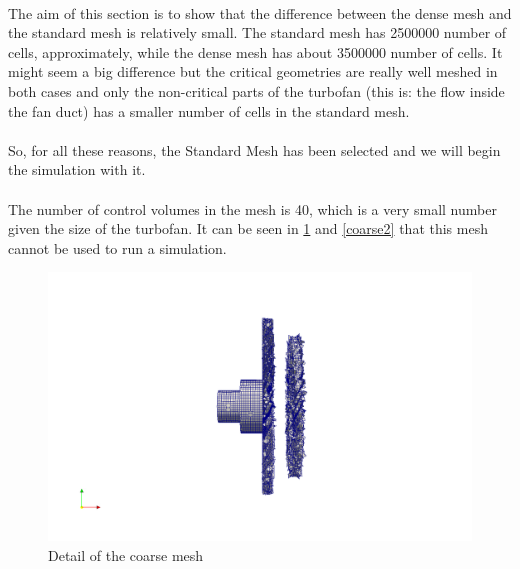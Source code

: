 \paragraph{}The aim of this section is to show that the difference between the dense mesh and the standard mesh is relatively small. The standard mesh has 2500000 number of cells, approximately, while the dense mesh has about 3500000 number of cells. It might seem a big difference but the critical geometries are really well meshed in both cases and only the non-critical parts of the turbofan (this is: the flow inside the fan duct) has a smaller number of cells in the standard mesh.

\paragraph{}So, for all these reasons, the Standard Mesh has been selected and we will begin the simulation with it.

\newpage{}

\paragraph{}The number of control volumes in the mesh is 40, which is a very small number given the size of the turbofan. It can be seen in \ref{coarse1} and \ref{coarse2} that this mesh cannot be used to run a simulation.

\begin{figure}[h!]
\includegraphics[scale=0.28]{./mesh/newmesh/coarse15}
\centering
\caption{Detail of the coarse mesh}
\label{coarse1}
\end{figure}

